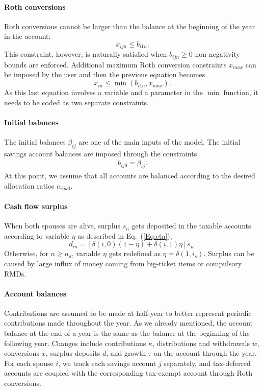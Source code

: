 \documentclass{report}[fleqn,12pt]
\begin{document}
\paragraph*{Roth conversions}
	Roth conversions cannot be larger than the balance at the beginning of the year in the account:
	\begin{equation}
		x_{ijn} \le b_{i1n}.
	\end{equation}
	This constraint, however, is naturally satisfied when $b_{ijn} \ge 0$ non-negativity bounds are enforced.
	Additional maximum Roth conversion constraints $x_{max}$ can be imposed by the user and
	then the previous equation becomes
	\begin{equation}
		x_{in} \le \min(b_{i1n}, x_{max}).
	\end{equation}
	As this last equation involves a variable and a parameter in the $\min$ function,
	it needs to be coded as two separate constraints.

\paragraph*{Initial balances}
	The initial balances $\beta_{ij}$ are one of the main inputs of the model.
	The initial savings account balances are imposed through the constraints
	\begin{eqnarray}
		\label{Eq:InitialBalance}
		b_{ij0} = \beta_{ij}.
	\end{eqnarray}
	At this point, we assume that all accounts are balanced according to the desired
	allocation ratios $\alpha_{ijk0}$.

\paragraph*{Cash flow surplus}
	When both spouses are alive, surplus $s_n$ gets deposited in the taxable accounts
	according to variable $\eta$ as described in Eq.~(\ref{Eq:eta}),
	\begin{equation}
		\label{Eq:eta2}
		d_{in} = [\delta(i, 0)(1 - \eta) + \delta(i, 1)\eta] s_n .
	\end{equation}
	Otherwise, for $n \ge n_d$, variable $\eta$ gets redefined as $\eta = \delta(1, i_s)$.
	Surplus can be caused by large influx of money coming from big-ticket items or compulsory RMDs.

\paragraph*{Account balances}
	Contributions are assumed to be made at half-year to better represent periodic contributions
	made throughout the year. As we already mentioned,
	the account balance at the end of a year is the same as the balance
	at the beginning of the following year.
	Changes include contributions $\kappa$, distributions and withdrawals $w$,
	conversions $x$, surplus deposits $d$, and growth $\tau$ on the account through the year.
	For each spouse $i$, we track each savings account $j$ separately, and tax-deferred accounts
	are coupled with the corresponding tax-exempt account through Roth conversions.
\end{document}
